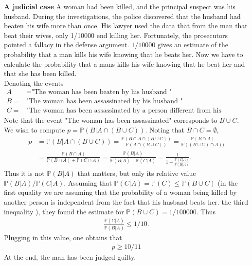 \documentclass[reqno]{amsart}
\newcommand{\<}{{\langle \!\! \langle}}
\renewcommand{\>}{{\rangle \!\! \rangle}}
\newcommand{\bel}[2]{\begin{equation} \label{#1} \begin{split} #2
 					\end{split} \end{equation}}
\begin{document}
\textbf{A judicial case} A woman had been killed, and the principal suspect was his husband. During the investigations, the police discovered that the husband had beaten his wife more than once. His lawyer used the data that from the man that beat their wives, only 1/10000 end killing her. Fortunately, the prosecutors pointed a fallacy in the defense argument. $1/10000$ gives an estimate of the probability that a man kills his wife knowing that he beats her. Now we have to calculate the probability that a mans kills his wife knowing that he beat her and that she has been killed.\\
Denoting the events
\bel{}{
A &=\textrm{"The woman has been beaten by his husband  "}\\ B=&\textrm{"The woman has been assassinated by his husband  "} \\ C=&\textrm{"The woman has been assassinated by a person different from his husband "}}
Note that the event "The woman has been assassinated" corresponds to $B\cup C$. We wish to compute 
$p=\mathbb{P}(B\vert A\cap(B\cup C))$. Noting that $B\cap C=\emptyset,$
\bel{}{p& =\mathbb{P}(B\vert A\cap(B\cup C))=\frac{\mathbb{P}(B\cap A\cap (B\cup C))}{\mathbb{P}(A\cap (B\cup C))}=\frac{\mathbb{P}(B\cap A)}{\mathbb{P}((B\cup C)\cap A))}\\
 &=\frac{\mathbb{P}(B\cap A)}{\mathbb{P}(B\cap A)+\mathbb{P}(C\cap A)}=\frac{\mathbb{P}(B|A)}{\mathbb{P}(B|A)+\mathbb{P}(C|A)}=\frac{1}{1+\frac{\mathbb{P}(C|A)}{\mathbb{P}(B|A)}}.}
Thus it is not $\mathbb{P}(B|A)$ that matters, but only its relative value $\mathbb{P}(B|A)/\mathbb{P}(C|A)$. Assuming that $\mathbb{P}(C|A)=\mathbb{P}(C)\leq \mathbb{P}(B\cup C)$ (in the first equality we are assuming that the probability of a woman being killed by another person is independent from the fact that his husband beats her. the third inequality ), they found the estimate for $\mathbb{P}(B\cup C)=1/100000$. Thus \bel{}{\frac{\mathbb{P}(C|A)}{\mathbb{P}(B|A)}\leq 1/10.}
Plugging in this value, one obtains that
\bel{}{p\geq 10/11}
At the end, the man has been judged guilty. 
\end{document}
